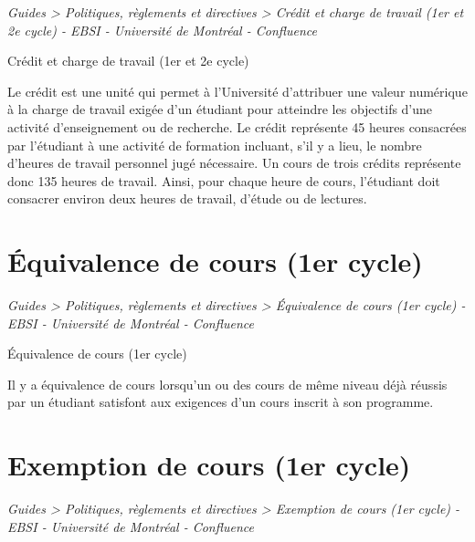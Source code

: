 \documentclass [12 pt]{article}
\begin{document}
        
        
        \textit{
        Guides > Politiques, règlements et directives > Crédit et charge de travail
            (1er et 2e cycle) - EBSI - Université de Montréal - Confluence
        }
    
        Crédit et charge de travail (1er et 2e cycle)
        
            Le crédit est une unité qui permet à l'Université d'attribuer une valeur numérique à
                la charge de travail exigée d'un étudiant pour atteindre les objectifs d'une
                activité d'enseignement ou de recherche. Le crédit représente 45 heures consacrées
                par l'étudiant à une activité de formation incluant, s'il y a lieu, le nombre
                d'heures de travail personnel jugé nécessaire. Un cours de trois crédits représente
                donc 135 heures de travail. Ainsi, pour chaque heure de cours, l'étudiant doit
                consacrer environ deux heures de travail, d'étude ou de lectures.
        
    
    
        \newpage
        \section {
        Équivalence de cours (1er cycle)
        }
        
        
        
        \textit{
        Guides > Politiques, règlements et directives > Équivalence de cours (1er
            cycle) - EBSI - Université de Montréal - Confluence
        }
    
        Équivalence de cours (1er cycle)
        
            Il y a équivalence de cours lorsqu'un ou des cours de même niveau déjà réussis par un
                étudiant satisfont aux exigences d'un cours inscrit à son programme. 
        
    
    
        \newpage
        \section {
        Exemption de cours (1er cycle)
        }
        
        
        
        \textit{
        Guides > Politiques, règlements et directives > Exemption de cours (1er cycle)
            - EBSI - Université de Montréal - Confluence
        }
    
\end{document}

